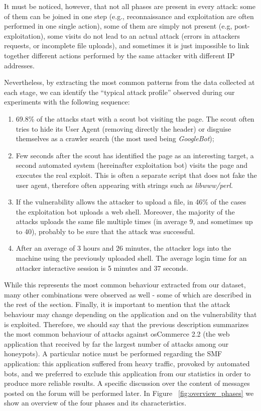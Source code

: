 It must be noticed, however, that not all phases are present in every attack: some of them can be joined in one step (e.g., reconnaissance and exploitation are often performed in one single action), some of them are simply not present (e.g, post-exploitation), some visits do not lead to an actual attack (errors in attackers requests, or incomplete file uploads), and sometimes it is just impossible to link together different actions performed by the same attacker with different IP addresses.

Nevertheless, by extracting the most common patterns from the data collected at each stage, we can identify the ``typical attack profile'' observed during our experiments with the following sequence:

\begin{enumerate}
\item
69.8\% of the attacks start with a scout bot visiting the page. The scout often tries to hide its User Agent (removing directly the header) or disguise themselves as a crawler search (the most used being \emph{GoogleBot});
\item
Few seconds after the scout has identified the page as an interesting target, a second automated system (hereinafter exploitation bot) visits the page and executes the real exploit. This is often a separate script that does not fake the user agent, therefore often appearing with strings such as \emph{libwww/perl}.
\item
If the vulnerability allows the attacker to upload a file, in 46\% of the cases the exploitation bot uploads a web shell. Moreover, the majority of the attacks uploads the same file multiple times (in average 9, and sometimes up to 40), probably to be sure that the attack was successful.
\item
After an average of 3 hours and 26 minutes, the attacker logs into the machine using the previously uploaded shell. The average login time for an attacker interactive session is 5 minutes and 37 seconds.
\end{enumerate}

While this represents the most common behaviour extracted from our dataset, many other combinations were observed as well - some of which are described in the rest of the section. Finally, it is important to mention that the attack behaviour may change depending on the application and on the vulnerability that is exploited. Therefore, we should say that the previous description summarizes the most common behaviour of attacks against osCommerce 2.2 (the web application that received by far the largest number of attacks among our honeypots). A particular notice must be performed regarding the SMF application: this application suffered from heavy traffic, provoked by automated bots, and we preferred to exclude this application from our statistics in order to produce more reliable results. A specific discussion over the content of messages posted on the forum will be performed later. In Figure ~\ref{fig:overview_phases} we show an overview of the four phases and its characteristics.

